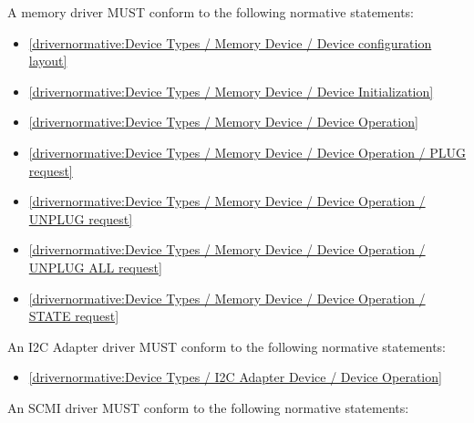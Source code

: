 \label{sec:Conformance / Driver Conformance / Memory Driver Conformance}

A memory driver MUST conform to the following normative statements:

\begin{itemize}
\item \ref{drivernormative:Device Types / Memory Device / Device configuration layout}
\item \ref{drivernormative:Device Types / Memory Device / Device Initialization}
\item \ref{drivernormative:Device Types / Memory Device / Device Operation}
\item \ref{drivernormative:Device Types / Memory Device / Device Operation / PLUG request}
\item \ref{drivernormative:Device Types / Memory Device / Device Operation / UNPLUG request}
\item \ref{drivernormative:Device Types / Memory Device / Device Operation / UNPLUG ALL request}
\item \ref{drivernormative:Device Types / Memory Device / Device Operation / STATE request}
\end{itemize}

\label{sec:Conformance / Driver Conformance / I2C Adapter Driver Conformance}

An I2C Adapter driver MUST conform to the following normative statements:

\begin{itemize}
\item \ref{drivernormative:Device Types / I2C Adapter Device / Device Operation}
\end{itemize}

\label{sec:Conformance / Driver Conformance / SCMI Driver Conformance}

An SCMI driver MUST conform to the following normative statements:

